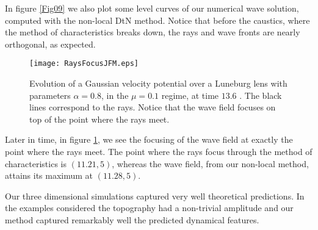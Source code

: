 In figure \ref{Fig09} we also plot  some level curves of our numerical wave  solution, 
computed with the non-local DtN method. Notice that before the caustics, where the method of characteristics breaks down, 
the rays and wave fronts are nearly orthogonal, as expected.
\begin{figure}
\texttt{[image: RaysFocusJFM.eps]}
\caption{Evolution of a Gaussian velocity potential over a Luneburg lens with parameters $\alpha = 0.8$, in the $\mu = 0.1$ regime, at time $13.6$ . The black lines correspond to the rays. Notice that the wave field focuses on top of the point where the rays meet.}
\label{Fig10}
\end{figure}
Later in time, in figure \ref{Fig10}, we see the focusing of the wave field at exactly the point where the rays meet. 
The point where the rays focus through the method of characteristics is $(11.21,5)$, whereas 
the wave field, from our non-local method, attains its maximum at $(11.28,5)$. 

Our three dimensional simulations captured very well theoretical predictions. 
In the examples considered the topography had a non-trivial amplitude and our method captured remarkably well the 
predicted dynamical features.


